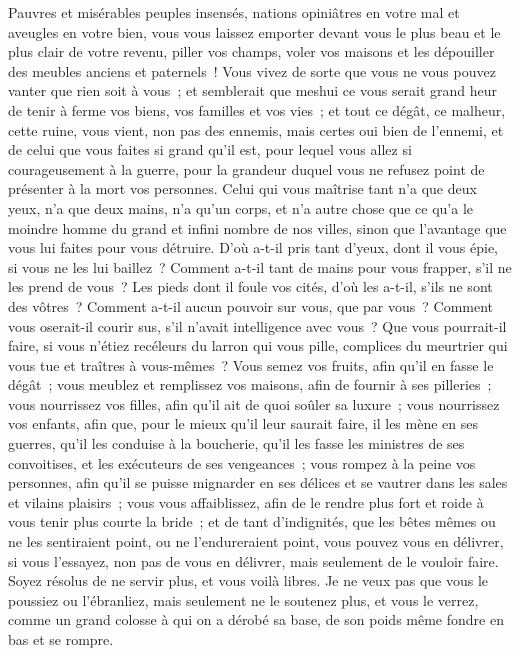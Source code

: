 \documentclass[french,twoside]{book} %
\begin{document}
Pauvres et misérables peuples insensés, nations opiniâtres en votre mal et aveugles en votre bien, vous vous laissez emporter devant vous le plus beau et le plus clair de votre revenu, piller vos champs, voler vos maisons et les dépouiller des meubles anciens et paternels ! Vous vivez de sorte que vous ne vous pouvez vanter que rien soit à vous ; et semblerait que meshui ce vous serait grand heur de tenir à ferme vos biens, vos familles et vos vies ; et tout ce dégât, ce malheur, cette ruine, vous vient, non pas des ennemis, mais certes oui bien de l’ennemi, et de celui que vous faites si grand qu’il est, pour lequel vous allez si courageusement à la guerre, pour la grandeur duquel vous ne refusez point de présenter à la mort vos personnes. Celui qui vous maîtrise tant n’a que deux yeux, n’a que deux mains, n’a qu’un corps, et n’a autre chose que ce qu’a le moindre homme du grand et infini nombre de nos villes, sinon que l’avantage que vous lui faites pour vous détruire. D’où a-t-il pris tant d’yeux, dont il vous épie, si vous ne les lui baillez ? Comment a-t-il tant de mains pour vous frapper, s’il ne les prend de vous ? Les pieds dont il foule vos cités, d’où les a-t-il, s’ils ne sont des vôtres ? Comment a-t-il aucun pouvoir sur vous, que par vous ? Comment vous oserait-il courir sus, s’il n’avait intelligence avec vous ? Que vous pourrait-il faire, si vous n’étiez recéleurs du larron qui vous pille, complices du meurtrier qui vous tue et traîtres à vous-mêmes ? Vous semez vos fruits, afin qu’il en fasse le dégât ; vous meublez et remplissez vos maisons, afin de fournir à ses pilleries ; vous nourrissez vos filles, afin qu’il ait de quoi soûler sa luxure ; vous nourrissez vos enfants, afin que, pour le mieux qu’il leur saurait faire, il les mène en ses guerres, qu’il les conduise à la boucherie, qu’il les fasse les ministres de ses convoitises, et les exécuteurs de ses vengeances ; vous rompez à la peine vos personnes, afin qu’il se puisse mignarder en ses délices et se vautrer dans les sales et vilains plaisirs ; vous vous affaiblissez, afin de le rendre plus fort et roide à vous tenir plus courte la bride ; et de tant d’indignités, que les bêtes mêmes ou ne les sentiraient point, ou ne l’endureraient point, vous pouvez vous en délivrer, si vous l’essayez, non pas de vous en délivrer, mais seulement de le vouloir faire. Soyez résolus de ne servir plus, et vous voilà libres. Je ne veux pas que vous le poussiez ou l’ébranliez, mais seulement ne le soutenez plus, et vous le verrez, comme un grand colosse à qui on a dérobé sa base, de son poids même fondre en bas et se rompre.\par
\end{document}
